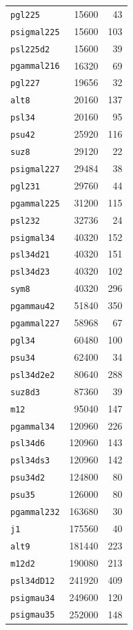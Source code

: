 \begin{longtable}{lrr}
\texttt{pgl225} & 15600 & 43\\
\texttt{psigmal225} & 15600 & 103\\
\texttt{psl225d2} & 15600 & 39\\
\texttt{pgammal216} & 16320 & 69\\
\texttt{pgl227} & 19656 & 32\\
\texttt{alt8} & 20160 & 137\\
\texttt{psl34} & 20160 & 95\\
\texttt{psu42} & 25920 & 116\\
\texttt{suz8} & 29120 & 22\\
\texttt{psigmal227} & 29484 & 38\\
\texttt{pgl231} & 29760 & 44\\
\texttt{pgammal225} & 31200 & 115\\
\texttt{psl232} & 32736 & 24\\
\texttt{psigmal34} & 40320 & 152\\
\texttt{psl34d21} & 40320 & 151\\
\texttt{psl34d23} & 40320 & 102\\
\texttt{sym8} & 40320 & 296\\
\texttt{pgammau42} & 51840 & 350\\
\texttt{pgammal227} & 58968 & 67\\
\texttt{pgl34} & 60480 & 100\\
\texttt{psu34} & 62400 & 34\\
\texttt{psl34d2e2} & 80640 & 288\\
\texttt{suz8d3} & 87360 & 39\\
\texttt{m12} & 95040 & 147\\
\texttt{pgammal34} & 120960 & 226\\
\texttt{psl34d6} & 120960 & 143\\
\texttt{psl34ds3} & 120960 & 142\\
\texttt{psu34d2} & 124800 & 80\\
\texttt{psu35} & 126000 & 80\\
\texttt{pgammal232} & 163680 & 30\\
\texttt{j1} & 175560 & 40\\
\texttt{alt9} & 181440 & 223\\
\texttt{m12d2} & 190080 & 213\\
\texttt{psl34dD12} & 241920 & 409\\
\texttt{psigmau34} & 249600 & 120\\
\texttt{psigmau35} & 252000 & 148\\

\end{longtable}
